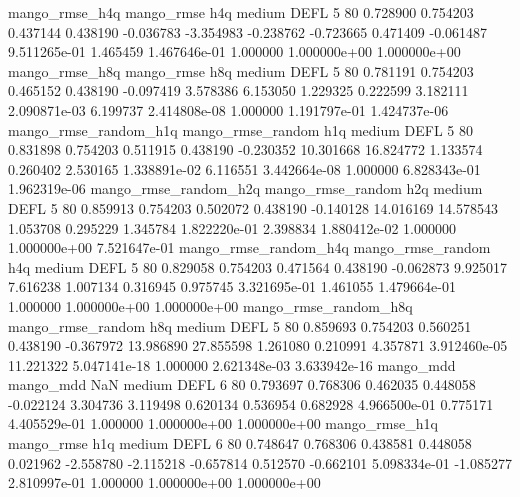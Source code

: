        mango_rmse_h4q        mango_rmse                  h4q     medium     DEFL                 5 80  0.728900       0.754203 0.437144       0.438190   -0.036783     -3.354983     -0.238762    -0.723665       0.471409 -0.061487 9.511265e-01     1.465459   1.467646e-01            1.000000    1.000000e+00        1.000000e+00
       mango_rmse_h8q        mango_rmse                  h8q     medium     DEFL                 5 80  0.781191       0.754203 0.465152       0.438190   -0.097419      3.578386      6.153050     1.229325       0.222599  3.182111 2.090871e-03     6.199737   2.414808e-08            1.000000    1.191797e-01        1.424737e-06
mango_rmse_random_h1q mango_rmse_random                  h1q     medium     DEFL                 5 80  0.831898       0.754203 0.511915       0.438190   -0.230352     10.301668     16.824772     1.133574       0.260402  2.530165 1.338891e-02     6.116551   3.442664e-08            1.000000    6.828343e-01        1.962319e-06
mango_rmse_random_h2q mango_rmse_random                  h2q     medium     DEFL                 5 80  0.859913       0.754203 0.502072       0.438190   -0.140128     14.016169     14.578543     1.053708       0.295229  1.345784 1.822220e-01     2.398834   1.880412e-02            1.000000    1.000000e+00        7.521647e-01
mango_rmse_random_h4q mango_rmse_random                  h4q     medium     DEFL                 5 80  0.829058       0.754203 0.471564       0.438190   -0.062873      9.925017      7.616238     1.007134       0.316945  0.975745 3.321695e-01     1.461055   1.479664e-01            1.000000    1.000000e+00        1.000000e+00
mango_rmse_random_h8q mango_rmse_random                  h8q     medium     DEFL                 5 80  0.859693       0.754203 0.560251       0.438190   -0.367972     13.986890     27.855598     1.261080       0.210991  4.357871 3.912460e-05    11.221322   5.047141e-18            1.000000    2.621348e-03        3.633942e-16
            mango_mdd         mango_mdd                  NaN     medium     DEFL                 6 80  0.793697       0.768306 0.462035       0.448058   -0.022124      3.304736      3.119498     0.620134       0.536954  0.682928 4.966500e-01     0.775171   4.405529e-01            1.000000    1.000000e+00        1.000000e+00
       mango_rmse_h1q        mango_rmse                  h1q     medium     DEFL                 6 80  0.748647       0.768306 0.438581       0.448058    0.021962     -2.558780     -2.115218    -0.657814       0.512570 -0.662101 5.098334e-01    -1.085277   2.810997e-01            1.000000    1.000000e+00        1.000000e+00
